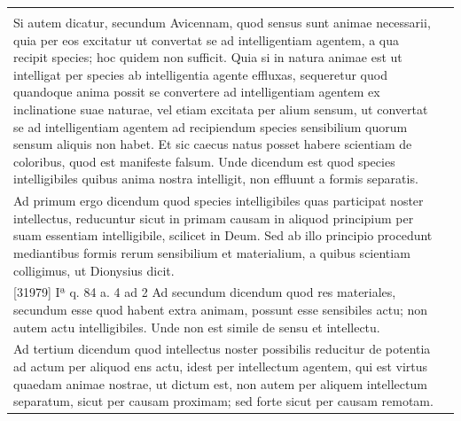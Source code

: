 \documentclass[paper=a4paper,fontsize=10pt,jafontsize=9pt,titlepage]{jlreq}
\begin{document}
\begin{longtable}{p{21em}p{21em}}
 &

 
 


 
\\[1em]

 Si autem dicatur, secundum Avicennam, quod sensus sunt animae necessarii, quia
 per eos excitatur ut convertat se ad intelligentiam agentem, a qua recipit
 species; hoc quidem non sufficit. Quia si in natura animae est ut intelligat
 per species ab intelligentia agente effluxas, sequeretur quod quandoque anima
 possit se convertere ad intelligentiam agentem ex inclinatione suae naturae,
 vel etiam excitata per alium sensum, ut convertat se ad intelligentiam agentem
 ad recipiendum species sensibilium quorum sensum aliquis non habet. Et sic
 caecus natus posset habere scientiam de coloribus, quod est manifeste
 falsum. Unde dicendum est quod species intelligibiles quibus anima nostra
 intelligit, non effluunt a formis separatis.
  
&

\\[1em]


 Ad primum ergo dicendum quod species intelligibiles quas participat noster intellectus, reducuntur sicut in primam causam in aliquod principium per suam essentiam intelligibile, scilicet in Deum. Sed ab illo principio procedunt mediantibus formis rerum sensibilium et materialium, a quibus scientiam colligimus, ut Dionysius dicit.

  
&



\\[1em]




[31979] Iª q. 84 a. 4 ad 2
 Ad secundum dicendum quod res materiales, secundum esse quod habent extra animam, possunt esse sensibiles actu; non autem actu intelligibiles. Unde non est simile de sensu et intellectu.

  
&



\\[1em]





 Ad tertium dicendum quod intellectus noster possibilis reducitur de potentia ad actum per aliquod ens actu, idest per intellectum agentem, qui est virtus quaedam animae nostrae, ut dictum est, non autem per aliquem intellectum separatum, sicut per causam proximam; sed forte sicut per causam remotam.
 
&


\end{longtable}
\newpage
\end{document}
